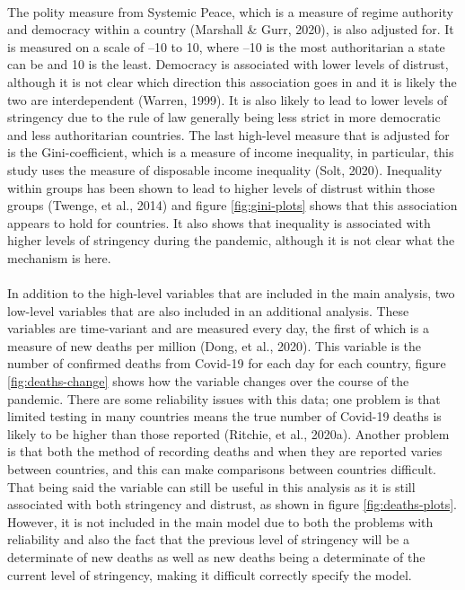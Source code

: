 \documentclass[
  11pt,
]{article}
\begin{document}
~\\
The polity measure from Systemic Peace, which is a measure of regime authority and democracy within a country (Marshall \& Gurr, 2020), is also adjusted for. It is measured on a scale of --10 to 10, where --10 is the most authoritarian a state can be and 10 is the least. Democracy is associated with lower levels of distrust, although it is not clear which direction this association goes in and it is likely the two are interdependent (Warren, 1999). It is also likely to lead to lower levels of stringency due to the rule of law generally being less strict in more democratic and less authoritarian countries. The last high-level measure that is adjusted for is the Gini-coefficient, which is a measure of income inequality, in particular, this study uses the measure of disposable income inequality (Solt, 2020). Inequality within groups has been shown to lead to higher levels of distrust within those groups (Twenge, et al., 2014) and figure \ref{fig:gini-plots} shows that this association appears to hold for countries. It also shows that inequality is associated with higher levels of stringency during the pandemic, although it is not clear what the mechanism is here.\\
~\\
In addition to the high-level variables that are included in the main analysis, two low-level variables that are also included in an additional analysis. These variables are time-variant and are measured every day, the first of which is a measure of new deaths per million (Dong, et al., 2020). This variable is the number of confirmed deaths from Covid-19 for each day for each country, figure \ref{fig:deaths-change} shows how the variable changes over the course of the pandemic. There are some reliability issues with this data; one problem is that limited testing in many countries means the true number of Covid-19 deaths is likely to be higher than those reported (Ritchie, et al., 2020a). Another problem is that both the method of recording deaths and when they are reported varies between countries, and this can make comparisons between countries difficult. That being said the variable can still be useful in this analysis as it is still associated with both stringency and distrust, as shown in figure \ref{fig:deaths-plots}. However, it is not included in the main model due to both the problems with reliability and also the fact that the previous level of stringency will be a determinate of new deaths as well as new deaths being a determinate of the current level of stringency, making it difficult correctly specify the model.\\
\end{document}
